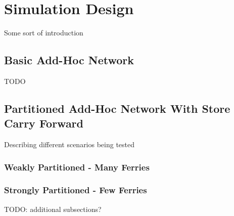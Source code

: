 \chapter{Simulation Design} 

Some sort of introduction

\section{Basic Add-Hoc Network}

TODO

\section{Partitioned Add-Hoc Network With Store Carry Forward}

Describing different scenarios being tested

\subsection{Weakly Partitioned - Many Ferries}

\subsection{Strongly Partitioned - Few Ferries}

TODO: additional subsections?